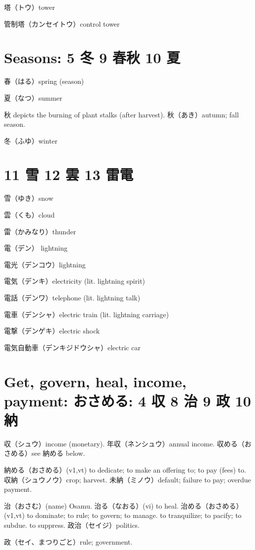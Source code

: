 塔（トウ）tower

管制塔（カンセイトウ）control tower

\section{Seasons: 5 冬 9 春秋 10 夏}

春（はる）spring (season)

夏（なつ）summer

秋 depicts the burning of plant stalks (after harvest).
秋（あき）autumn; fall season.

冬（ふゆ）winter

\section{11 雪 12 雲 13 雷電}

雪（ゆき）snow

雲（くも）cloud

雷（かみなり）thunder

電（デン） lightning

電光（デンコウ）lightning

電気（デンキ）electricity (lit. lightning spirit)

電話（デンワ）telephone (lit. lightning talk)

電車（デンシャ）electric train (lit. lightning carriage)

電撃（デンゲキ）electric shock

電気自動車（デンキジドウシャ）electric car

\section{Get, govern, heal, income, payment: おさめる: 4 収 8 治 9 政 10 納}

収（シュウ）income (monetary).
年収（ネンシュウ）annual income.
収める（おさめる）see 納める below.

納める（おさめる）(v1,vt)
to dedicate; to make an offering to; to pay (fees) to.
収納（シュウノウ）crop; harvest.
未納（ミノウ）default; failure to pay; overdue payment.

治（おさむ）(name) Osamu.
治る（なおる）(vi) to heal.
治める（おさめる）(v1,vt)
to dominate; to rule; to govern; to manage.
to tranquilize; to pacify; to subdue.
to suppress.
政治（セイジ）politics.

政（セイ、まつりごと）rule; government.

